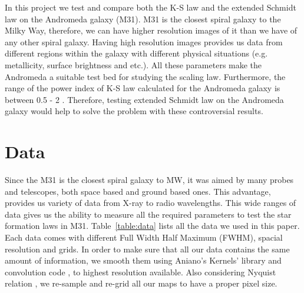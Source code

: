 \documentclass[useAMS,usenatbib]{mn2e}
\begin{document}
In this project we test and compare both the K-S law and the extended Schmidt law on the Andromeda galaxy (M31). M31 is the closest spiral galaxy to the Milky Way, therefore, we can have higher resolution images of it than we have of any other spiral galaxy. Having high resolution images provides us data from different regions within
the galaxy with different physical situations (e.g. metallicity, surface brightness and etc.). All these parameters make the Andromeda a suitable test bed for studying the scaling law.
Furthermore, the range of the power index of K-S law calculated for the Andromeda galaxy is between 0.5 - 2 \citep[e.g.,][]{Tabatabaei10,Ford13}. Therefore, testing extended Schmidt law on the Andromeda galaxy would help to solve the problem with these controversial results.


\section{Data}
\label{sec:data}
Since the M31 is the closest spiral galaxy to MW, it was aimed by many probes and telescopes, both space based and ground based ones. This advantage, provides us variety of data from X-ray to radio wavelengths. This wide ranges of data gives us the ability to measure all the required parameters to test the star formation laws in M31. Table~\ref{table:data} lists all the data we used in this paper. Each data comes with different Full Width Half Maximum (FWHM), spacial resolution and grids. In order to make sure that all our data contains the same amount of information, we smooth them using Aniano's Kernels' library and convolution code \citep{Aniano12}, to highest resolution available. Also considering Nyquist relation \citep{Nyquist}, we re-sample and re-grid all our maps to have a proper pixel size.
\end{document}
